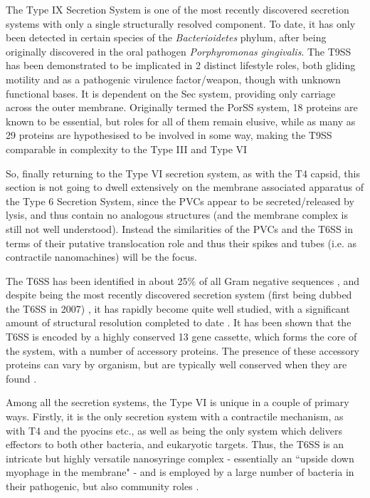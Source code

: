 The Type IX Secretion System is one of the most recently discovered secretion systems with only a single structurally resolved component. To date, it has only been detected in certain species of the \emph{Bacterioidetes} phylum, after being originally discovered in the oral pathogen \emph{Porphyromonas gingivalis}. The T9SS has been demonstrated to be implicated in 2 distinct lifestyle roles, both gliding motility and as a pathogenic virulence factor/weapon, though with unknown functional bases. It is dependent on the Sec system, providing only carriage across the outer membrane. Originally termed the PorSS system, 18 proteins are known to be essential, but roles for all of them remain elusive, while as many as 29 proteins are hypothesised to be involved in some way, making the T9SS comparable in complexity to the Type III and Type VI \citep{Lasica2017a}


So, finally returning to the Type VI secretion system, as with the T4 capsid, this section is not going to dwell extensively on the membrane associated apparatus of the Type 6 Secretion System, since the PVCs appear to be secreted/released by lysis, and thus contain no analogous structures (and the membrane complex is still not well understood). Instead the similarities of the PVCs and the T6SS in terms of their putative translocation role and thus their spikes and tubes (i.e. as contractile nanomachines) will be the focus.

The T6SS has been identified in about 25\% of all Gram negative sequences \citep{Basler2015a}, and despite being the most recently discovered secretion system (first being dubbed the T6SS in 2007) \citep{Nguyen2018, Pukatzki2007, Cascales2012}, it has rapidly become quite well studied, with a significant amount of structural resolution completed to date \citep{Mougous2006a}. It has been shown that the T6SS is encoded by a highly conserved 13 gene cassette, which forms the core of the system, with a number of accessory proteins. The presence of these accessory proteins can vary by organism, but are typically well conserved when they are found \citep{Basler2015a}.

Among all the secretion systems, the Type VI is unique in a couple of primary ways. Firstly, it is the only secretion system with a contractile mechanism, as with T4 and the pyocins etc., as well as being the only system which delivers effectors to both other bacteria, and eukaryotic targets. Thus, the T6SS is an intricate but highly versatile nanosyringe complex - essentially an ``upside down myophage in the membrane" - and is employed by a large number of bacteria in their pathogenic, but also community roles \citep{Russell2014}. 


